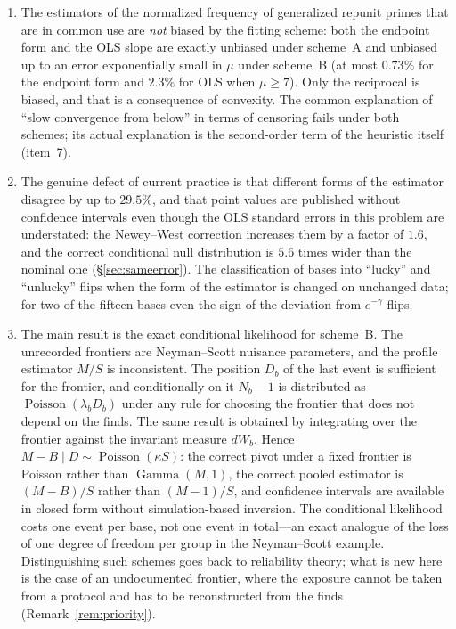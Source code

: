\documentclass[11pt,a4paper]{article}
\theoremstyle{plain}
\theoremstyle{remark}
\newcommand{\emg}{e^{-\gamma}}
\DeclareMathOperator{\Gam}{Gamma}
\DeclareMathOperator{\Pois}{Poisson}
\begin{document}
\begin{enumerate}
\item The estimators of the normalized frequency of generalized repunit primes
that are in common use are \emph{not} biased by the fitting scheme: both the
endpoint form and the OLS slope are exactly unbiased under scheme~A and unbiased
up to an error exponentially small in $\mu$ under scheme~B (at most $0.73\%$ for
the endpoint form and $2.3\%$ for OLS when $\mu\ge7$). Only the reciprocal is
biased, and that is a consequence of convexity. The common explanation of ``slow
convergence from below'' in terms of censoring fails under both schemes; its
actual explanation is the second-order term of the heuristic itself (item~7).

\item The genuine defect of current practice is that different forms of the
estimator disagree by up to $29.5\%$, and that point values are published
without confidence intervals even though the OLS standard errors in this problem
are understated: the Newey--West correction increases them by a factor of $1.6$,
and the correct conditional null distribution is $5.6$ times wider than the
nominal one (\S\ref{sec:sameerror}). The classification of bases into ``lucky''
and ``unlucky'' flips when the form of the estimator is changed on unchanged
data; for two of the fifteen bases even the sign of the deviation from $\emg$
flips.

\item The main result is the exact conditional likelihood for scheme~B. The
unrecorded frontiers are Neyman--Scott nuisance parameters, and the profile
estimator $M/S$ is inconsistent. The position $D_b$ of the last event is
sufficient for the frontier, and conditionally on it $N_b-1$ is distributed as
$\Pois(\lambda_bD_b)$ under any rule for choosing the frontier that does not
depend on the finds. The same result is obtained by integrating over the
frontier against the invariant measure $dW_b$. Hence
$M-B\mid D\sim\Pois(\kappa S)$: the correct pivot under a fixed frontier is
Poisson rather than $\Gam(M,1)$, the correct pooled estimator is $(M-B)/S$
rather than $(M-1)/S$, and confidence intervals are available in closed form
without simulation-based inversion. The conditional likelihood costs one event
per base, not one event in total---an exact analogue of the loss of one degree
of freedom per group in the Neyman--Scott example. Distinguishing such schemes
goes back to reliability theory; what is new here is the case of an
undocumented frontier, where the exposure cannot be taken from a protocol and
has to be reconstructed from the finds (Remark~\ref{rem:priority}).


\end{enumerate}
\end{document}
